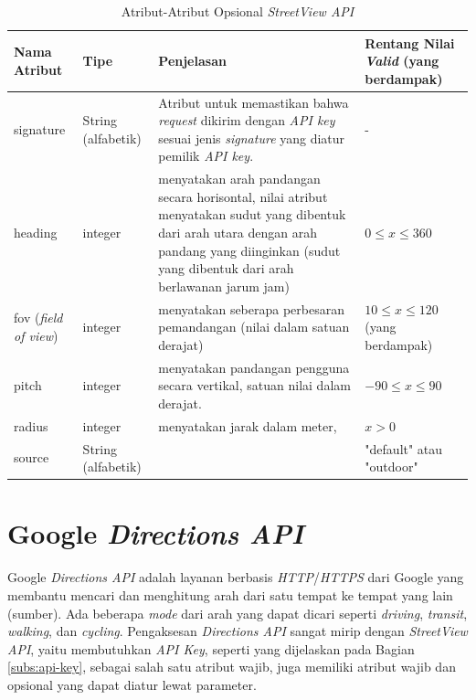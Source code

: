 \begin{table}[ht!]
	\centering
	\caption{Atribut-Atribut Opsional \textit{StreetView API}}
	\label{tab:atribut-opsional-streetview-api}
\begin{tabular}{|p{3cm}|p{3cm}|p{5cm}|p{4cm}|}

\hline
Nama Atribut & Tipe & Penjelasan & Rentang Nilai \textit{Valid} (yang berdampak)\\ \hline
signature & String (alfabetik) &  Atribut untuk memastikan bahwa \textit{request} dikirim dengan {\it API key} sesuai jenis \textit{signature} yang diatur pemilik {\it API key}. & - \\ \hline
heading & integer & menyatakan arah pandangan secara horisontal, nilai atribut menyatakan sudut yang dibentuk dari arah utara dengan arah pandang yang diinginkan (sudut yang dibentuk dari arah berlawanan jarum jam) & $ 0 \leq x \leq 360 $ \\ \hline
fov (\textit{field of view}) & integer & menyatakan seberapa perbesaran pemandangan (nilai dalam satuan derajat) & $ 10 \leq x \leq 120 $ (yang berdampak)\\ \hline
pitch & integer & menyatakan pandangan pengguna secara vertikal, satuan nilai dalam derajat.& $ -90 \leq  x \leq 90$\\ \hline
radius & integer & menyatakan jarak dalam meter,  & $ x > 0 $\\ \hline
source & String (alfabetik) &  & "default" atau "outdoor"\\ 
\hline

\end{tabular}
\end{table}

\section{Google {\it Directions API}}
\label{sec:directions}
Google {\it Directions API} adalah layanan berbasis \textit{HTTP}/\textit{HTTPS} dari Google yang membantu mencari dan menghitung arah dari satu tempat ke tempat yang lain (sumber). Ada beberapa \textit{mode} dari arah yang dapat dicari seperti {\it driving}, {\it transit}, {\it walking}, dan {\it cycling}. Pengaksesan \textit{Directions API} sangat mirip dengan {\it StreetView API}, yaitu membutuhkan \textit{API Key}, seperti yang dijelaskan pada Bagian \ref{subs:api-key}, sebagai salah satu atribut wajib, juga memiliki atribut wajib dan opsional yang dapat diatur lewat parameter. 

